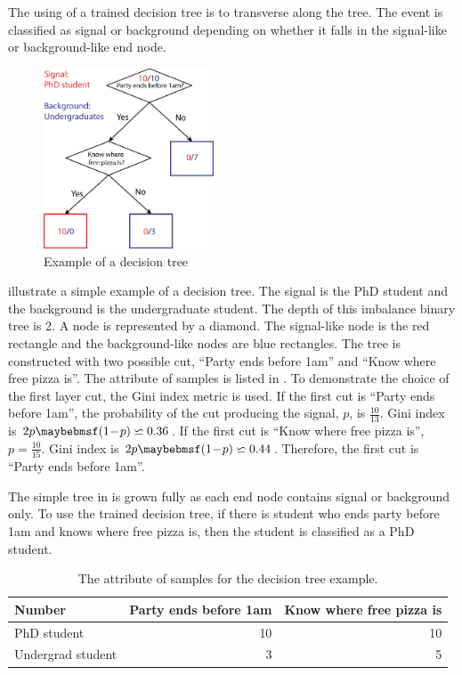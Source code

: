 The using of a trained decision tree is to transverse along the tree. The event is classified as signal or background depending on whether it falls in the signal-like or background-like end node.

\begin{figure}[!tbp]
\includegraphics[width=0.45\textwidth]{doubleHiggs/mva/BDTcomic}
\caption{Example of a decision tree}
   \label{fig:doubleHiggsMVAdecisionTree}
\end{figure}

 illustrate a simple example of a decision tree. The signal is the PhD student and the background is the undergraduate student. The depth of this imbalance binary  tree is 2. A node is represented by a diamond.  The signal-like node is the red rectangle and the background-like nodes are blue rectangles. The tree is constructed with two possible cut, ``Party ends before 1am'' and ``Know where free pizza is''. The attribute of samples is listed in . To demonstrate the choice of the first layer cut, the Gini index metric is used. If the first cut is ``Party ends before 1am'', the probability of the cut producing the signal, $p$, is $\frac{10}{13}$. Gini index is $2p\parenths{1\!-\!p} \backsimeq 0.36 $. If the first cut is ``Know where free pizza is'', $p=\frac{10}{15}$. Gini index is $2p\parenths{1\!-\!p} \backsimeq 0.44 $. Therefore, the first cut is ``Party ends before 1am''.

The simple tree in  is grown fully as each end node contains signal or background only. To use the trained decision tree, if there is student who ends party before 1am and knows where free pizza is, then the student is classified as a PhD student.

\begin{table}[!tbp]\centering
\small
\begin{tabular}{lrr}
\hline \hline
Number & Party ends before 1am  & Know where free pizza is\\
\hline
PhD student & 10 & 10 \\
Undergrad student & 3 & 5 \\
\hline \hline
\end{tabular}
\caption
{The attribute of samples for the decision tree example.}
\label{tab:doubleHiggsDecisionTreeComic}
\end{table}

